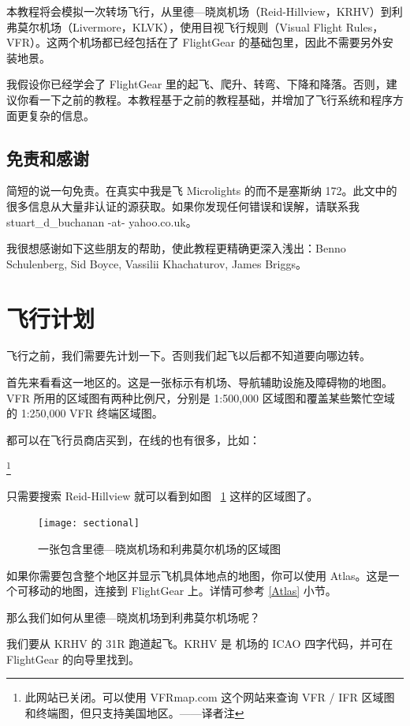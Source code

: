 本教程将会模拟一次转场飞行，从里德—晓岚机场（Reid-Hillview，KRHV）到利弗莫尔机场（Livermore，KLVK），使用目视飞行规则（Visual Flight Rules，VFR）。这两个机场都已经包括在了 FlightGear 的基础包里，因此不需要另外安装地景。

我假设你已经学会了 FlightGear 里的起飞、爬升、转弯、下降和降落。否则，建议你看一下之前的教程。本教程基于之前的教程基础，并增加了飞行系统和程序方面更复杂的信息。

\subsection{免责和感谢}

简短的说一句免责。在真实中我是飞 Microlights 的而不是塞斯纳 172。此文中的很多信息从大量非认证的源获取。如果你发现任何错误和误解，请联系我 stuart\_d\_buchanan -at- yahoo.co.uk。

我很想感谢如下这些朋友的帮助，使此教程更精确更深入浅出：Benno Schulenberg, Sid Boyce, Vassilii Khachaturov, James Briggs。

\section{飞行计划}

飞行之前，我们需要先计划一下。否则我们起飞以后都不知道要向哪边转。

首先来看看这一地区的。这是一张标示有机场、导航辅助设施及障碍物的地图。VFR 所用的区域图有两种比例尺，分别是 1:500,000 区域图和覆盖某些繁忙空域的 1:250,000 VFR 终端区域图。

都可以在飞行员商店买到，在线的也有很多，比如：

\medskip
{}\footnote{此网站已关闭。可以使用 VFRmap.com 这个网站来查询 VFR / IFR 区域图和终端图，但只支持美国地区。——译者注}
\medskip

只需要搜索 Reid-Hillview 就可以看到如图 ~\ref{sectional} 这样的区域图了。

\begin{figure}[!htp]
\centering
\texttt{[image: sectional]}
\caption{一张包含里德—晓岚机场和利弗莫尔机场的区域图\label{sectional}}
\end{figure}

如果你需要包含整个地区并显示飞机具体地点的地图，你可以使用 Atlas。这是一个可移动的地图，连接到 FlightGear 上。详情可参考 \ref{Atlas} 小节。

那么我们如何从里德—晓岚机场到利弗莫尔机场呢？

我们要从 KRHV 的 31R 跑道起飞。KRHV 是 机场的 ICAO 四字代码，并可在 FlightGear 的向导里找到。

